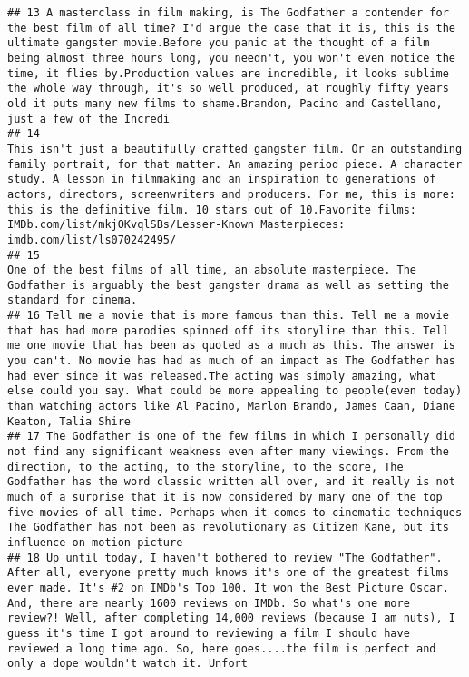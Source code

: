 \documentclass[
]{article}
\begin{document}
\begin{verbatim}
## 13 A masterclass in film making, is The Godfather a contender for the best film of all time? I'd argue the case that it is, this is the ultimate gangster movie.Before you panic at the thought of a film being almost three hours long, you needn't, you won't even notice the time, it flies by.Production values are incredible, it looks sublime the whole way through, it's so well produced, at roughly fifty years old it puts many new films to shame.Brandon, Pacino and Castellano, just a few of the Incredi
## 14                                                                               This isn't just a beautifully crafted gangster film. Or an outstanding family portrait, for that matter. An amazing period piece. A character study. A lesson in filmmaking and an inspiration to generations of actors, directors, screenwriters and producers. For me, this is more: this is the definitive film. 10 stars out of 10.Favorite films: IMDb.com/list/mkjOKvqlSBs/Lesser-Known Masterpieces: imdb.com/list/ls070242495/
## 15                                                                                                                                                                                                                                                                                                                                                            One of the best films of all time, an absolute masterpiece. The Godfather is arguably the best gangster drama as well as setting the standard for cinema.
## 16 Tell me a movie that is more famous than this. Tell me a movie that has had more parodies spinned off its storyline than this. Tell me one movie that has been as quoted as a much as this. The answer is you can't. No movie has had as much of an impact as The Godfather has had ever since it was released.The acting was simply amazing, what else could you say. What could be more appealing to people(even today) than watching actors like Al Pacino, Marlon Brando, James Caan, Diane Keaton, Talia Shire 
## 17 The Godfather is one of the few films in which I personally did not find any significant weakness even after many viewings. From the direction, to the acting, to the storyline, to the score, The Godfather has the word classic written all over, and it really is not much of a surprise that it is now considered by many one of the top five movies of all time. Perhaps when it comes to cinematic techniques The Godfather has not been as revolutionary as Citizen Kane, but its influence on motion picture
## 18 Up until today, I haven't bothered to review "The Godfather". After all, everyone pretty much knows it's one of the greatest films ever made. It's #2 on IMDb's Top 100. It won the Best Picture Oscar. And, there are nearly 1600 reviews on IMDb. So what's one more review?! Well, after completing 14,000 reviews (because I am nuts), I guess it's time I got around to reviewing a film I should have reviewed a long time ago. So, here goes....the film is perfect and only a dope wouldn't watch it. Unfort

\end{verbatim}
\end{document}
